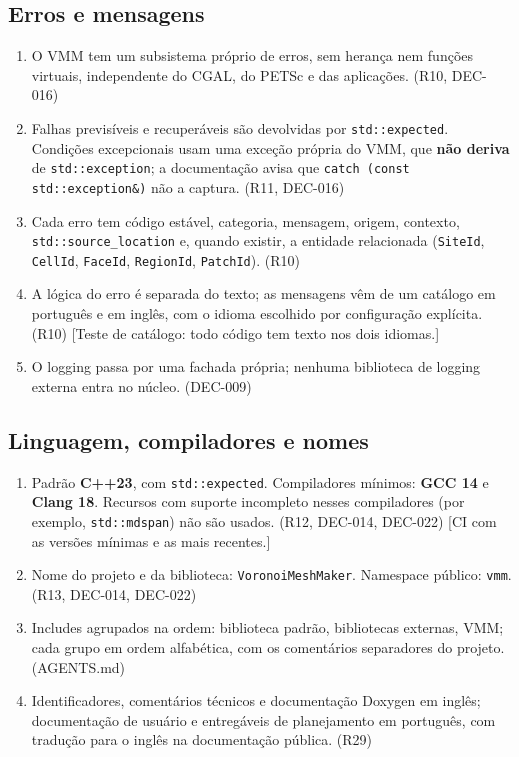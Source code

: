 \subsection{Erros e mensagens}

\begin{enumerate}
  \item O VMM tem um subsistema próprio de erros, sem herança nem funções virtuais, independente do CGAL, do
        PETSc e das aplicações. (R10, DEC-016)
  \item Falhas previsíveis e recuperáveis são devolvidas por \texttt{std::expected}. Condições excepcionais usam
        uma exceção própria do VMM, que \textbf{não deriva} de \texttt{std::exception}; a documentação avisa que
        \texttt{catch (const std::exception\&)} não a captura. (R11, DEC-016)
  \item Cada erro tem código estável, categoria, mensagem, origem, contexto, \texttt{std::source\_location} e,
        quando existir, a entidade relacionada (\texttt{SiteId}, \texttt{CellId}, \texttt{FaceId},
        \texttt{RegionId}, \texttt{PatchId}). (R10)
  \item A lógica do erro é separada do texto; as mensagens vêm de um catálogo em português e em inglês, com o
        idioma escolhido por configuração explícita. (R10)
        [Teste de catálogo: todo código tem texto nos dois idiomas.]
  \item O logging passa por uma fachada própria; nenhuma biblioteca de logging externa entra no núcleo. (DEC-009)
\end{enumerate}

\subsection{Linguagem, compiladores e nomes}

\begin{enumerate}
  \item Padrão \textbf{C++23}, com \texttt{std::expected}. Compiladores mínimos: \textbf{GCC 14} e
        \textbf{Clang 18}. Recursos com suporte incompleto nesses compiladores (por exemplo, \texttt{std::mdspan})
        não são usados. (R12, DEC-014, DEC-022)
        [CI com as versões mínimas e as mais recentes.]
  \item Nome do projeto e da biblioteca: \texttt{VoronoiMeshMaker}. Namespace público: \texttt{vmm}.
        (R13, DEC-014, DEC-022)
  \item Includes agrupados na ordem: biblioteca padrão, bibliotecas externas, VMM; cada grupo em ordem
        alfabética, com os comentários separadores do projeto. (AGENTS.md)
  \item Identificadores, comentários técnicos e documentação Doxygen em inglês; documentação de usuário e
        entregáveis de planejamento em português, com tradução para o inglês na documentação pública. (R29)
\end{enumerate}

